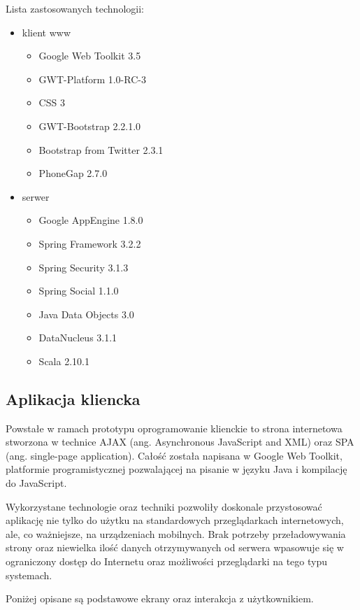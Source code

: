 Lista zastosowanych technologii:
\begin{itemize}
  
  \item klient www
  \begin{itemize}
    \item Google Web Toolkit 3.5
    \item GWT-Platform 1.0-RC-3
    \item CSS 3
    \item GWT-Bootstrap 2.2.1.0
    \item Bootstrap from Twitter 2.3.1
    \item PhoneGap 2.7.0
  \end{itemize}
  
  \item serwer
  \begin{itemize}
    \item Google AppEngine 1.8.0
    \item Spring Framework 3.2.2
    \item Spring Security 3.1.3
    \item Spring Social 1.1.0
    \item Java Data Objects 3.0
    \item DataNucleus 3.1.1
    \item Scala 2.10.1
  \end{itemize}
\end{itemize}

\subsection{Aplikacja kliencka}
Powstałe w ramach prototypu oprogramowanie klienckie to strona internetowa
stworzona w technice AJAX (ang. Asynchronous JavaScript and XML) oraz SPA (ang.
single-page application). Całość została napisana w Google Web Toolkit,
platformie programistycznej pozwalającej na pisanie w języku Java i kompilację
do JavaScript. 

Wykorzystane technologie oraz techniki pozwoliły doskonale przystosować
aplikację nie tylko do użytku na standardowych przeglądarkach internetowych,
ale, co ważniejsze, na urządzeniach mobilnych. Brak potrzeby przeładowywania
strony oraz niewielka ilość danych otrzymywanych od serwera wpasowuje się w
ograniczony dostęp do Internetu oraz możliwości przeglądarki na tego typu
systemach.

Poniżej opisane są podstawowe ekrany oraz interakcja z użytkownikiem.

